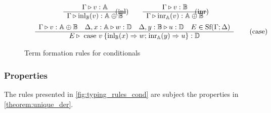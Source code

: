 \begin{figure} [H]
\begin{equation*}
\begin{split}
\begin{aligned}
& \hspace{55pt}
\begin{minipage}[t]{0.3\textwidth}
$\begin{array}{c}
     \Gamma \triangleright v: \mathbb{A} \\
    \hline
   \Gamma \triangleright \text{inl}_{\mathbb{B}}(v):  \mathbb{A} \oplus \mathbb{B}
\end{array}
$
\end{minipage}
\hspace{-30pt}
\text{(inl)} 
 \hspace{20pt}
\begin{minipage}[t]{0.3\textwidth}
$\begin{array}{c}
      \Gamma \triangleright v:  \mathbb{B} \\
    \hline
   \Gamma \triangleright \text{inr}_{\mathbb{A}}(v): \mathbb{A} \oplus \mathbb{B}
\end{array}
$ \end{minipage} 
\hspace{-30pt} \text{(inr)} \\
&\hspace{15pt}
\begin{minipage}[t]{0.3\textwidth}
$\begin{array}{c}
     \Gamma\triangleright v: \mathbb{A} \oplus \mathbb{B} \quad \Delta, x: \mathbb{A} \triangleright w: \mathbb{D} \quad \Delta, y: \mathbb{B}  \triangleright u : \mathbb{D}   \quad E \in \text{Sf}(\Gamma;\Delta)  \\
    \hline
   E \triangleright \text{ case } v \hspace{2pt} \{\text{inl}_{\mathbb{B}} (x) \Rightarrow w ; \hspace{1pt} \text{inr}_{\mathbb{A}} (y) \Rightarrow u\}: \mathbb{D} 
\end{array}
$
\end{minipage}
\hspace{200pt}
\text{(case)} 
\end{aligned}
\end{split}
\end{equation*}
\caption{Term formation rules for conditionals}
\label{fig:typing_rules_cond}
\end{figure}


\subsubsection{Properties}
The rules presented in \autoref{fig:typing_rules_cond} are subject 
the properties in \autoref{theorem:unique_der}.


